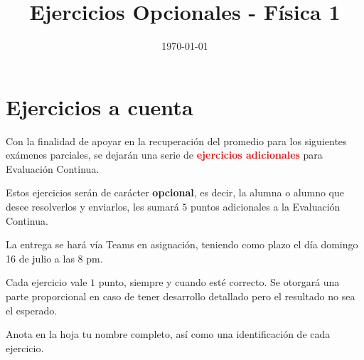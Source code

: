 \documentclass[14pt]{extarticle}
\title{\vspace*{-2cm} Ejercicios Opcionales - Física 1\vspace{-5ex}}
\date{\today}
\newcommand{\textocolor}[2]{\textbf{\textcolor{#1}{#2}}}
\begin{document}
\maketitle

\section{Ejercicios a cuenta}

Con la finalidad de apoyar en la recuperación del promedio para los siguientes exámenes parciales, se dejarán una serie de \textocolor{red}{ejercicios adicionales} para Evaluación Continua.


Estos ejercicios serán de carácter \textocolor{cobalt}{opcional}, es decir, la alumna o alumno que desee resolverlos y enviarlos, les sumará $5$ puntos adicionales a la Evaluación Continua.

La entrega se hará vía Teams en asignación, teniendo como plazo el día domingo 16 de julio a las 8 pm.

Cada ejercicio vale $1$ punto, siempre y cuando esté correcto. Se otorgará una parte proporcional en caso de tener desarrollo detallado pero el resultado no sea el esperado.

Anota en la hoja tu nombre completo, así como una identificación de cada ejercicio.
\end{document}
